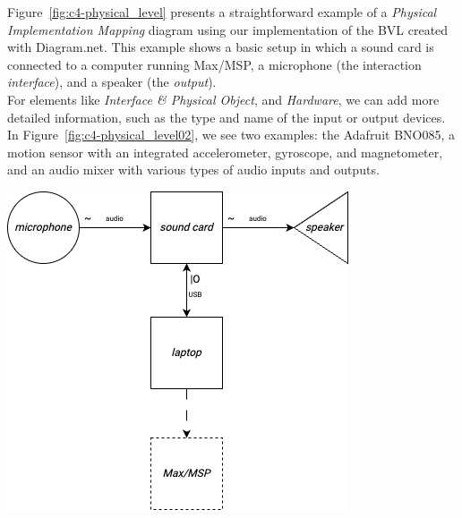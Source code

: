 Figure~\ref{fig:c4-physical_level} presents a straightforward example of a \textit{Physical Implementation Mapping} diagram using our implementation of the BVL created with Diagram.net. This example shows a basic setup in which a sound card is connected to a computer running Max/MSP, a microphone (the interaction \textit{interface}), and a speaker (the \textit{output}).\\
For elements like \textit{Interface \& Physical Object}, and \textit{Hardware}, we can add more detailed information, such as the type and name of the input or output devices. In Figure~\ref{fig:c4-physical_level02}, we see two examples: the Adafruit BNO085, a motion sensor with an integrated accelerometer, gyroscope, and magnetometer, and an audio mixer with various types of audio inputs and outputs.\\
\begin{minipage}[t]{0.45\textwidth}
    \centering
    \includegraphics[width=\linewidth]{chapters/4-MDC_model_application/image/bvl-physical_level.png}
    \label{fig:c4-physical_level}
\end{minipage}%
\hfill
